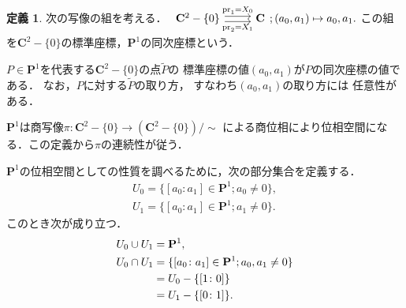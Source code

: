 \documentclass[11pt, a4paper, dvipdfmx]{jsarticle}
\theoremstyle{definition}
\newtheorem{Definition}[Axiom]{定義}
\newcommand{\cc}{\mathbf{C}}
\newcommand{\pp}{\mathbf{P}}
\newcommand{\pr}{\mathop{\mathrm{pr}}\nolimits} %
\theoremstyle{mystyle}
\numberwithin{equation}{section} %
\begin{document}
\begin{Definition}\label{def:coord1}
    次の写像の組を考える．
    $\begin{tikzcd}
      {\cc^{2}-\{0\}}
        \arrow[r, shift left ,"\pr_1=X_0"]
        \arrow[r, shift right,"\pr_2=X_1"']
      & {\cc}
    \end{tikzcd}; (a_0,a_1)\mapsto a_0,a_1.$
    この組を$\cc^{2}-\{0\}$の標準座標，$\pp^1$の同次座標という．
\end{Definition}
$P\in\pp^1$を代表する$\cc^{2}-\{0\}$の点$\widetilde{P}$の
標準座標の値$(a_0,a_1)$が$P$の同次座標の値である．
なお，$P$に対する$\widetilde{P}$の取り方，
すなわち$(a_0,a_1)$の取り方には
任意性がある．

$\pp^{1}$は商写像$\pi \colon \cc^{2}-\{0\}
\longrightarrow\left(\cc^{2}-\{0\}\right)/{\sim}$
による商位相により位相空間になる．この定義から$\pi$の連続性が従う．

$\pp^1$の位相空間としての性質を調べるために，次の部分集合を定義する．
\begin{align*}
    U_0=\{[a_0\colon a_1]\in\pp^1; a_0\neq0\},\\
    U_1=\{[a_0\colon a_1]\in\pp^1; a_1\neq0\}.
\end{align*}
このとき次が成り立つ．
\begin{align}
    U_0\cup U_1 &= \pp^1, \label{eq:cov1}\\
    U_0\cap U_1 
    &= \{[a_0\colon a_1]\in\pp^1; a_0, a_1\neq0\} \label{eq:inter-p1}\\
    &= U_0 - \{[1\colon 0]\}  \notag\\
    &= U_1 - \{[0\colon 1]\}. \notag
\end{align}
\end{document}
